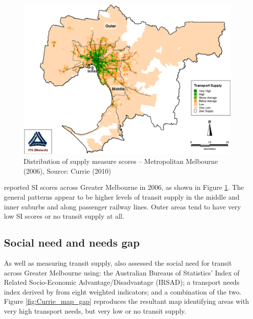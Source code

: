 \documentclass[preprint, 3p,
authoryear]{elsarticle} %
\begin{document}
\begin{figure}
\includegraphics[width=1\linewidth]{graphics/Currie2010SI} \caption{Distribution of supply measure scores – Metropolitan Melbourne (2006), Source: Currie (2010)}\label{fig:Currie_map_SI}
\end{figure}

\citet{currie2010identifying} reported SI scores across Greater
Melbourne in 2006, as shown in Figure \ref{fig:Currie_map_SI}. The
general patterns appear to be higher levels of transit supply in the
middle and inner suburbs and along passenger railway lines. Outer areas
tend to have very low SI scores or no transit supply at all.

\subsection{Social need and needs gap}\label{social-need-and-needs-gap}

As well as measuring transit supply, \citet{currie2010identifying} also
assessed the social need for transit across Greater Melbourne using: the
Australian Bureaus of Statistics' Index of Related Socio-Economic
Advantage/Disadvantage (IRSAD); a transport needs index derived by
\citet{currie2010identifying} from eight weighted indicators; and a
combination of the two. Figure \ref{fig:Currie_map_gap} reproduces the
resultant map identifying areas with very high transport needs, but very
low or no transit supply.
\end{document}
